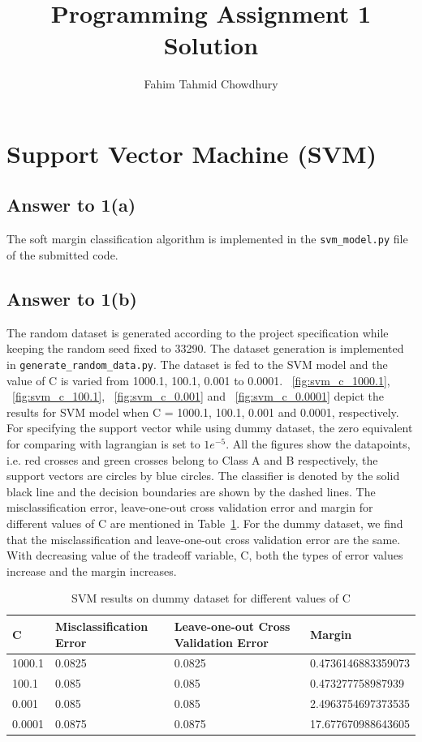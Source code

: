 \documentclass[runningheads]{llncs}
\begin{document}
%
\title{Programming Assignment 1 Solution}
\author{Fahim Tahmid Chowdhury}
\maketitle              %
%

\section{Support Vector Machine (SVM)}
\subsection{Answer to 1(a)}
The soft margin classification algorithm is implemented in the \texttt{svm\_model.py} file of the submitted code.

\subsection{Answer to 1(b)}
The random dataset is generated according to the project specification while keeping the random seed fixed to 33290.
The dataset generation is implemented in \texttt{generate\_random\_data.py}.
The dataset is fed to the SVM model and the value of C is varied from 1000.1, 100.1, 0.001 to 0.0001.
\figurename~\ref{fig:svm_c_1000.1}, \figurename~\ref{fig:svm_c_100.1}, \figurename~\ref{fig:svm_c_0.001} and
\figurename~\ref{fig:svm_c_0.0001} depict the results for SVM model when C = 1000.1, 100.1, 0.001 and 0.0001, respectively.
For specifying the support vector while using dummy dataset, the zero equivalent for comparing with lagrangian is set to $1e^{-5}$.
All the figures show the datapoints, i.e. red crosses and green crosses belong to Class A and B respectively,
the support vectors are circles by blue circles. The classifier is denoted by the solid black line and the decision boundaries are shown by the dashed lines.
The misclassification error, leave-one-out cross validation error and margin for different values of C are mentioned in Table~\ref{tab:table_C}.
For the dummy dataset, we find that the misclassification and leave-one-out cross validation error are the same. With decreasing
value of the tradeoff variable, C, both the types of error values increase and the margin increases.

\begin{table}
\caption{SVM results on dummy dataset for different values of C}\label{tab:table_C}
\begin{tabular}{|l|l|l|l|}
\hline
C &  Misclassification Error & Leave-one-out Cross Validation Error & Margin\\
\hline
1000.1 & 0.0825 & 0.0825 & 0.4736146883359073\\
100.1 & 0.085 & 0.085 & 0.473277758987939\\
0.001 & 0.085 & 0.085 & 2.4963754697373535\\
0.0001 & 0.0875 & 0.0875 & 17.677670988643605\\
\hline
\end{tabular}
\end{table}
\end{document}
